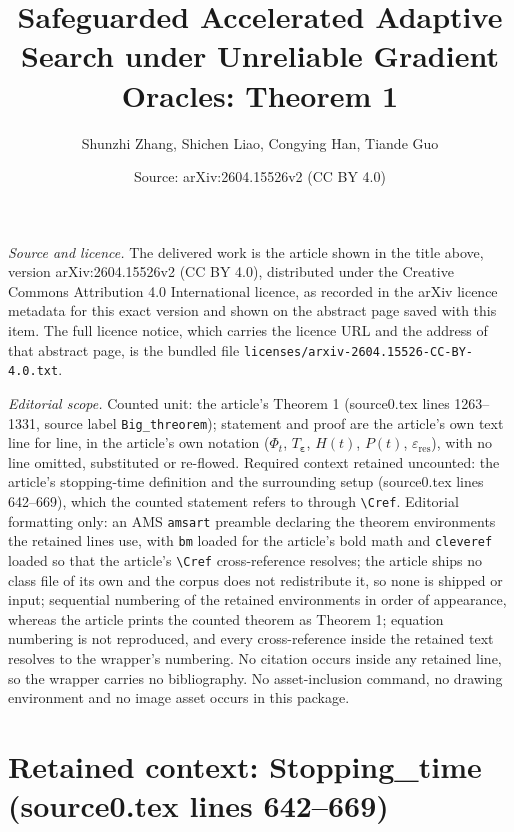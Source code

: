 \documentclass[10pt,a4paper]{amsart}
\title[Safeguarded Accelerated Adaptive Search under Unreliable Gradient Oracles]{Safeguarded Accelerated Adaptive Search under Unreliable Gradient Oracles: Theorem 1}
\author{Shunzhi Zhang, Shichen Liao, Congying Han, Tiande Guo}
\date{Source: arXiv:2604.15526v2 (CC BY 4.0)}
\theoremstyle{plain}
\theoremstyle{definition}
\theoremstyle{remark}
\begin{document}
\maketitle

\noindent\emph{Source and licence.} The delivered work is the article shown in the title above, version arXiv:2604.15526v2 (CC BY 4.0), distributed under the Creative Commons Attribution 4.0 International licence, as recorded in the arXiv licence metadata for this exact version and shown on the abstract page saved with this item. The full licence notice, which carries the licence URL and the address of that abstract page, is the bundled file \texttt{licenses/arxiv-2604.15526-CC-BY-4.0.txt}.\par\smallskip

\noindent\textit{Editorial scope.} Counted unit: the article's Theorem 1 (source0.tex lines 1263--1331, source label \texttt{Big\_threorem}); statement and proof are the article's own text line for line, in the article's own notation ($\Phi_t$, $T_{\boldsymbol\varepsilon}$, $H(t)$, $P(t)$, $\varepsilon_{\mathrm{res}}$), with no line omitted, substituted or re-flowed. Required context retained uncounted: the article's stopping-time definition and the surrounding setup (source0.tex lines 642--669), which the counted statement refers to through \texttt{\textbackslash Cref}. Editorial formatting only: an AMS \texttt{amsart} preamble declaring the theorem environments the retained lines use, with \texttt{bm} loaded for the article's bold math and \texttt{cleveref} loaded so that the article's \texttt{\textbackslash Cref} cross-reference resolves; the article ships no class file of its own and the corpus does not redistribute it, so none is shipped or input; sequential numbering of the retained environments in order of appearance, whereas the article prints the counted theorem as Theorem 1; equation numbering is not reproduced, and every cross-reference inside the retained text resolves to the wrapper's numbering. No citation occurs inside any retained line, so the wrapper carries no bibliography. No asset-inclusion command, no drawing environment and no image asset occurs in this package.


\section*{Retained context: Stopping\_time (source0.tex lines 642--669)}
\end{document}
